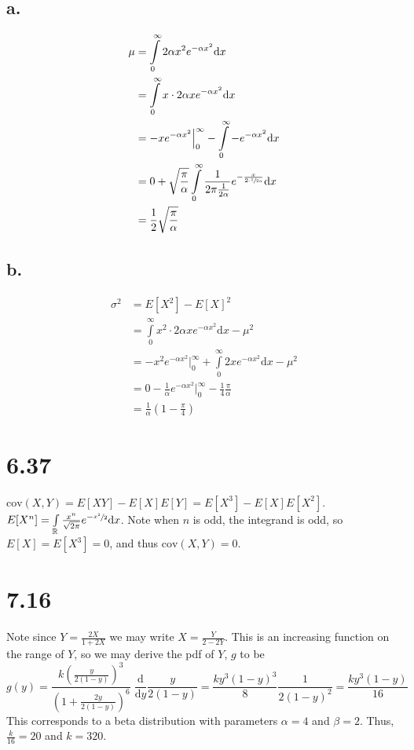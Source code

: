 \documentclass{article}
\begin{document}
\subsection*{a.}
\begin{equation*}
\begin{split}
    \mu &= \int\limits_0^\infty 2\alpha x^2e^{-\alpha x^2} \mathrm{d}x\\
    &= \int\limits_0^\infty x \cdot 2\alpha xe^{-\alpha x^2} \mathrm{d}x\\
    &= -xe^{-\alpha x^2} \Big\rvert_0^\infty - \int\limits_0^\infty -e^{-\alpha x^2} \mathrm{d}x\\
    &= 0 + \sqrt{\frac{\pi}{\alpha}}\int\limits_0^\infty \frac{1}{2\pi \frac{1}{2\alpha}}e^{-\frac{x}{2\cdot\sfrac{1}{2\alpha}}} \mathrm{d}x\\
    &= \frac{1}{2}\sqrt{\frac{\pi}{\alpha}}
\end{split}
\end{equation*}

\subsection*{b.}
\begin{equation*}
\begin{split}
    \sigma^2 &= E[X^2] - E[X]^2\\
    &= \int\limits_0^\infty x^2 \cdot 2\alpha x e^{-\alpha x^2} \mathrm{d}x - \mu^2\\
    &= -x^2e^{-\alpha x^2} \Big\rvert_0^\infty + \int\limits_0^\infty 2xe^{-\alpha x^2} \mathrm{d}x - \mu^2\\
    &= 0 - \frac{1}{\alpha}e^{-\alpha x^2} \Big\rvert_0^\infty  - \frac{1}{4}\frac{\pi}{\alpha}\\
    &= \frac{1}{\alpha}\left(1 - \frac{\pi}{4}\right)
\end{split}
\end{equation*}

\section*{6.37}
$\mathrm{cov}(X,Y) = E[XY] - E[X]E[Y] = E[X^3] - E[X]E[X^2]$.\\
$E[X^n] = \int\limits_\mathbb{R} \frac{x^n}{\sqrt{2\pi}}e^{-\sfrac{x^2}{2}} \mathrm{d}x$. Note when $n$ is odd, the integrand is odd, so $E[X] = E[X^3] = 0$, and thus $\mathrm{cov}(X,Y) = 0$.

\section*{7.16}
Note since $Y = \frac{2X}{1+2X}$ we may write $X = \frac{Y}{2-2Y}$. This is an increasing function on the range of $Y$, so we may derive the pdf of $Y$, $g$ to be
$$g(y) = \frac{k\left(\frac{y}{2(1-y)}\right)^3}{\left(1+\frac{2y}{2(1-y)}\right)^6}\;\frac{\mathrm{d}}{\mathrm{d}y}\frac{y}{2(1-y)} = \frac{ky^3(1-y)^3}{8}\frac{1}{2(1-y)^2}=\frac{ky^3(1-y)}{16}$$
This corresponds to a beta distribution with parameters $\alpha = 4$ and $\beta = 2$. Thus, $\frac{k}{16} = 20$ and $k = 320$.
\end{document}
